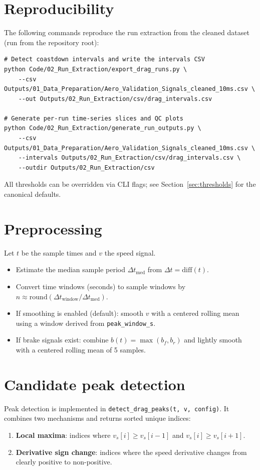 \documentclass[11pt,a4paper]{article}
\begin{document}
\section{Reproducibility}
The following commands reproduce the run extraction from the cleaned dataset
(run from the repository root):

\begin{verbatim}
# Detect coastdown intervals and write the intervals CSV
python Code/02_Run_Extraction/export_drag_runs.py \
    --csv Outputs/01_Data_Preparation/Aero_Validation_Signals_cleaned_10ms.csv \
    --out Outputs/02_Run_Extraction/csv/drag_intervals.csv

# Generate per-run time-series slices and QC plots
python Code/02_Run_Extraction/generate_run_outputs.py \
    --csv Outputs/01_Data_Preparation/Aero_Validation_Signals_cleaned_10ms.csv \
    --intervals Outputs/02_Run_Extraction/csv/drag_intervals.csv \
    --outdir Outputs/02_Run_Extraction/csv
\end{verbatim}

All thresholds can be overridden via CLI flags; see Section~\ref{sec:thresholds}
for the canonical defaults.

\section{Preprocessing}
Let $t$ be the sample times and $v$ the speed signal.
\begin{itemize}
  \item Estimate the median sample period $\Delta t_\mathrm{med}$ from $\Delta t = \mathrm{diff}(t)$.
  \item Convert time windows (seconds) to sample windows by $n \approx \mathrm{round}(\Delta t_\mathrm{window}/\Delta t_\mathrm{med})$.
  \item If smoothing is enabled (default): smooth $v$ with a centered rolling mean using a window derived from \texttt{peak\_window\_s}.
  \item If brake signals exist: combine $b(t)=\max(b_f,b_r)$ and lightly smooth with a centered rolling mean of 5 samples.
\end{itemize}

\section{Candidate peak detection}
Peak detection is implemented in \texttt{detect\_drag\_peaks(t, v, config)}.
It combines two mechanisms and returns sorted unique indices:
\begin{enumerate}
  \item \textbf{Local maxima}: indices where $v_s[i] \ge v_s[i-1]$ and $v_s[i] \ge v_s[i+1]$.
  \item \textbf{Derivative sign change}: indices where the speed derivative changes from clearly positive to non-positive.
\end{enumerate}
\end{document}
